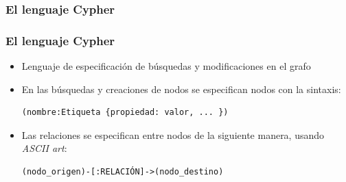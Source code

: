 \documentclass[14pt]{beamer}
\begin{document}





\subsubsection{El lenguaje Cypher}

\begin{frame}[fragile]
  \frametitle{El lenguaje Cypher}
  \begin{itemize}
\item Lenguaje de especificación de búsquedas y modificaciones en el
  grafo
\item En las búsquedas y creaciones de nodos se especifican nodos con la
  sintaxis:
\begin{lstlisting}[language=cypher]
(nombre:Etiqueta {propiedad: valor, ... })
\end{lstlisting}

\item Las relaciones se especifican entre nodos de la siguiente manera,
  usando {\em ASCII art}:

\begin{lstlisting}[language=cypher]
(nodo_origen)-[:RELACIÓN]->(nodo_destino)
\end{lstlisting}
  \end{itemize}
\end{frame}
\end{document}
